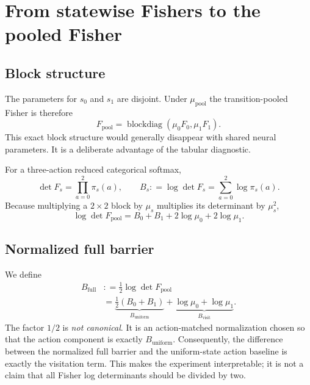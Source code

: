 \documentclass[10pt,a4paper]{article}
\newcommand{\pool}{\mathrm{pool}}
\newcommand{\coloneqq}{\mathrel{\mathop:}=}
\begin{document}
\section{From statewise Fishers to the pooled Fisher}

\subsection{Block structure}

The parameters for $s_0$ and $s_1$ are disjoint.  Under $\mu_{\pool}$ the
transition-pooled Fisher is therefore
\begin{equation}
\boxed{F_{\pool}
=\operatorname{blockdiag}(\mu_0F_0,\mu_1F_1).}
\label{eq:pooled-fisher}
\end{equation}
This exact block structure would generally disappear with shared neural
parameters.  It is a deliberate advantage of the tabular diagnostic.

For a three-action reduced categorical softmax,
\begin{equation}
\det F_s=\prod_{a=0}^{2}\pi_s(a),
\qquad
B_s\coloneqq\log\det F_s=\sum_{a=0}^{2}\log\pi_s(a).
\end{equation}
Because multiplying a $2\times2$ block by $\mu_s$ multiplies its determinant by
$\mu_s^2$,
\begin{equation}
\boxed{
\log\det F_{\pool}
=B_0+B_1+2\log\mu_0+2\log\mu_1.}
\label{eq:pooled-logdet}
\end{equation}

\subsection{Normalized full barrier}

We define
\begin{align}
B_{\mathrm{full}}
&\coloneqq\frac12\log\det F_{\pool}\\
&=\underbrace{\frac12(B_0+B_1)}_{B_{\mathrm{uniform}}}
+\underbrace{\log\mu_0+\log\mu_1}_{B_{\mathrm{visit}}}.
\label{eq:full-decomposition}
\end{align}
The factor $1/2$ is \emph{not canonical}.  It is an action-matched
normalization chosen so that the action component is exactly
$B_{\mathrm{uniform}}$.  Consequently, the difference between the normalized
full barrier and the uniform-state action baseline is exactly the visitation
term.  This makes the experiment interpretable; it is not a claim that all
Fisher log determinants should be divided by two.
\end{document}
